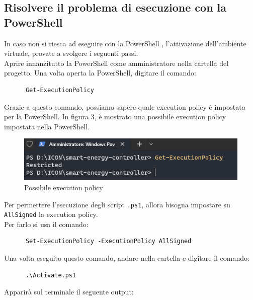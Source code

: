 \documentclass[12pt, letterpaper]{article}
\begin{document}
\subsection{Risolvere il problema di esecuzione con la PowerShell}
\label{sec:powershell-error}

In caso non si riesca ad eseguire con la PowerShell \cite{power-shell-resolution},
l'attivazione dell'ambiente virtuale, provate a svolgere i seguenti passi. \\

\noindent Aprire innanzitutto la PowerShell come amministratore nella cartella del progetto.
Una volta aperta la PowerShell, digitare il comando:

\begin{verbatim}
      Get-ExecutionPolicy
\end{verbatim}

Grazie a questo comando, possiamo sapere quale execution policy è impostata per la PowerShell.
In figura 3, è mostrato una possibile execution policy impostata nella PowerShell. \\

\begin{figure}[h]
      \centering
      \includegraphics{powershell-error.png}
      \caption{Possibile execution policy}
\end{figure}

\noindent Per permettere l'esecuzione degli script \texttt{.ps1}, allora bisogna impostare
su \texttt{AllSigned} la execution policy. \\
\noindent Per farlo si usa il comando: \\

\begin{verbatim}
      Set-ExecutionPolicy -ExecutionPolicy AllSigned
\end{verbatim}

Una volta eseguito questo comando, andare nella cartella  e digitare il
comando:

\begin{verbatim}
      .\Activate.ps1
\end{verbatim}

Apparirà sul terminale il seguente output: \\
\end{document}
